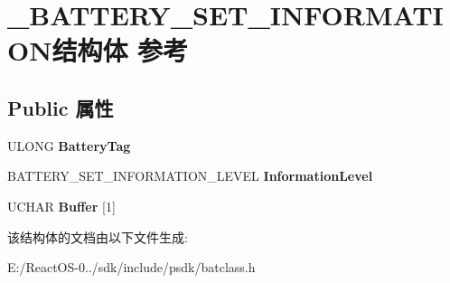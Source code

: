 \hypertarget{struct___b_a_t_t_e_r_y___s_e_t___i_n_f_o_r_m_a_t_i_o_n}{}\section{\+\_\+\+B\+A\+T\+T\+E\+R\+Y\+\_\+\+S\+E\+T\+\_\+\+I\+N\+F\+O\+R\+M\+A\+T\+I\+O\+N结构体 参考}
\label{struct___b_a_t_t_e_r_y___s_e_t___i_n_f_o_r_m_a_t_i_o_n}
\subsection*{Public 属性}
\begin{DoxyCompactItemize}
\item 
\mbox{\label{struct___b_a_t_t_e_r_y___s_e_t___i_n_f_o_r_m_a_t_i_o_n_a33171f7b4159657b01b9a68e46fca9a3}} 
U\+L\+O\+NG {\bfseries Battery\+Tag}
\item 
\mbox{\label{struct___b_a_t_t_e_r_y___s_e_t___i_n_f_o_r_m_a_t_i_o_n_a7465f616ddfe65668f551d7ec891d3f3}} 
B\+A\+T\+T\+E\+R\+Y\+\_\+\+S\+E\+T\+\_\+\+I\+N\+F\+O\+R\+M\+A\+T\+I\+O\+N\+\_\+\+L\+E\+V\+EL {\bfseries Information\+Level}
\item 
\mbox{\label{struct___b_a_t_t_e_r_y___s_e_t___i_n_f_o_r_m_a_t_i_o_n_a33d57392202cb9c2c79daa8153224ebe}} 
U\+C\+H\+AR {\bfseries Buffer} \mbox{[}1\mbox{]}
\end{DoxyCompactItemize}


该结构体的文档由以下文件生成\+:\begin{DoxyCompactItemize}
\item 
E\+:/\+React\+O\+S-\/0../sdk/include/psdk/batclass.\+h\end{DoxyCompactItemize}
